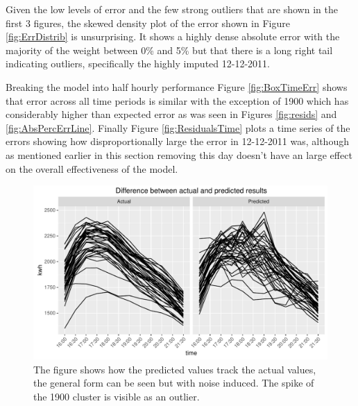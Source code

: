 Given the low levels of error and the few strong outliers that are shown in the first 3 figures, the skewed density plot of the error shown in Figure \ref{fig:ErrDistrib} is unsurprising. It shows a highly dense absolute error with the majority of the weight between 0\% and 5\% but that there is a long right tail indicating outliers, specifically the highly imputed 12-12-2011.

Breaking the model into half hourly performance Figure \ref{fig:BoxTimeErr} shows that error across all time periods is similar with the exception of 1900 which has considerably higher than expected error as was seen in Figures \ref{fig:resids} and \ref{fig:AbsPercErrLine}. Finally  Figure \ref{fig:ResidualsTime} plots a time series of the errors showing how disproportionally large the error in 12-12-2011 was, although as mentioned earlier in this section removing this day doesn't have an large effect on the overall effectiveness of the model.

\begin{figure}
    \centering
    \includegraphics[width=\textwidth]{Figures/Results/ActualVsPredLine}
    \caption[Comparing actual vs predicted results]{The figure shows how the predicted values track the actual values, the general form can be seen but with noise induced. The spike of the 1900 cluster is visible as an outlier.}
    \label{fig:ActualVsPredLine}
\end{figure}



